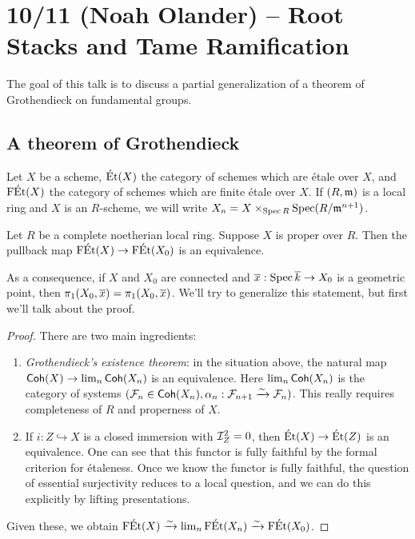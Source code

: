 \documentclass{amsart}
\begin{document}
\section{10/11 (Noah Olander) -- Root Stacks and Tame Ramification}

The goal of this talk is to discuss a partial generalization of a theorem of Grothendieck on fundamental groups.

\subsection{A theorem of Grothendieck}

Let $X$ be a scheme, $\mathrm{\acute{E}t}(X)$ the category of schemes which are \'etale over $X$, and $\mathrm{F\acute{E}t}(X)$ the category of schemes which are finite \'etale over $X$.
If $(R, \mathfrak{m})$ is a local ring and $X$ is an $R$-scheme, we will write $X_n = X \times_{\operatorname{Spec} R} \operatorname{Spec}(R / \mathfrak{m}^{n+1})$.

\begin{thm}
	Let $R$ be a complete noetherian local ring.
	Suppose $X$ is proper over $R$.
	Then the pullback map $\mathrm{F\acute{E}t}(X) \to \mathrm{F\acute{E}t}(X_0)$ is an equivalence.
\end{thm}

As a consequence, if $X$ and $X_0$ are connected and $\overline{x}: \operatorname{Spec} \overline{k}  \to X_0$ is a geometric point, then $\pi_1(X_0, \overline{x}) = \pi_1(X_0, \overline{x})$.
We'll try to generalize this statement, but first we'll talk about the proof.

\begin{proof}
	There are two main ingredients:
	\begin{enumerate}
		\item \emph{Grothendieck's existence theorem}: in the situation above, the natural map $\mathsf{Coh}(X) \to \lim_n \mathsf{Coh}(X_n)$ is an equivalence.
			Here $\lim_n \mathsf{Coh}(X_n)$ is the category of systems $(\mathcal{F}_n \in \mathsf{Coh}(X_n), \alpha_n: \mathcal{F}_{n+1} \xrightarrow{\sim} \mathcal{F}_n)$.
			This really requires completeness of $R$ and properness of $X$.
		\item If $i: Z \hookrightarrow X$ is a closed immersion with $\mathcal{I}_Z^2 = 0$, then $\mathrm{\acute{E}t}(X) \to \mathrm{\acute{E}t}(Z)$ is an equivalence.
			One can see that this functor is fully faithful by the formal criterion for \'etaleness.
			Once we know the functor is fully faithful, the question of essential surjectivity reduces to a local question, and we can do this explicitly by lifting presentations.
	\end{enumerate}
	Given these, we obtain $\mathrm{F\acute{E}t}(X) \xrightarrow{\sim} \lim_n \mathrm{F\acute{E}t}(X_n) \xrightarrow{\sim} \mathrm{F\acute{E}t}(X_0)$.
\end{proof}
\end{document}
